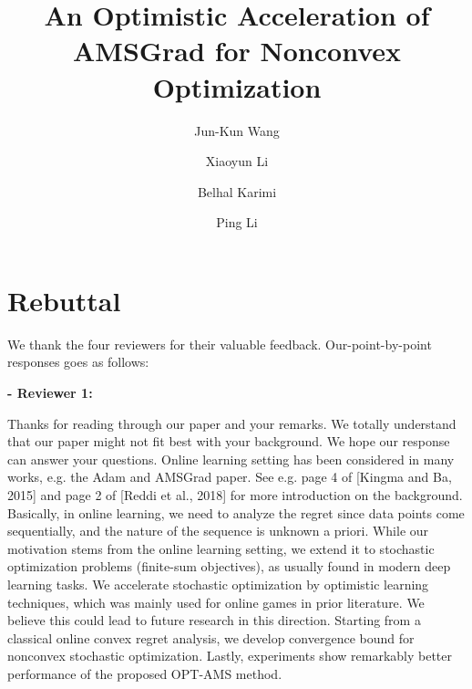 \documentclass{article}
\title{An Optimistic Acceleration of AMSGrad for Nonconvex Optimization}
\author{Jun-Kun Wang \and Xiaoyun Li \and Belhal Karimi \and Ping Li}
\date{}
\begin{document}
\maketitle

\section{Rebuttal}

We thank the four reviewers for their valuable feedback. 
Our-point-by-point responses goes as follows:



\textbf{- Reviewer 1:}

Thanks for reading through our paper and your remarks. 
We totally understand that our paper might not fit best with your background. We hope our response can answer your questions.
Online learning setting has been considered in many works, e.g. the Adam and AMSGrad paper. See e.g. page 4 of [Kingma and Ba, 2015] and page 2 of [Reddi et al., 2018] for more introduction on the background. 
Basically, in online learning, we need to analyze the regret since data points come sequentially, and the nature of the sequence is unknown a priori. 
While our motivation stems from the online learning setting, we extend it to stochastic optimization problems (finite-sum objectives), as usually found in modern deep learning tasks. 
We accelerate stochastic optimization by optimistic learning techniques, which was mainly used for online games in prior literature. 
We believe this could lead to future research in this direction. 
Starting from a classical online convex regret analysis, we develop convergence bound for nonconvex stochastic optimization. 
Lastly, experiments show remarkably better performance of the proposed OPT-AMS method.


\end{document}

